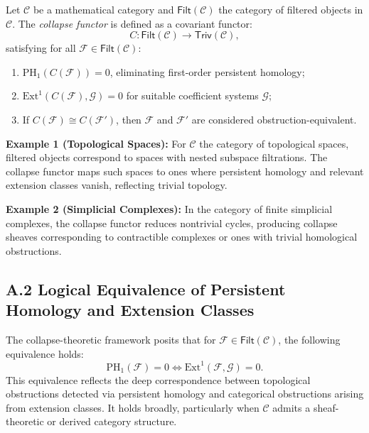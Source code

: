 \documentclass[11pt]{article}
\begin{document}
Let $\mathcal{C}$ be a mathematical category and $\mathsf{Filt}(\mathcal{C})$ the category of filtered objects in $\mathcal{C}$. The \emph{collapse functor} is defined as a covariant functor:
\begin{equation}
C : \mathsf{Filt}(\mathcal{C}) \longrightarrow \mathsf{Triv}(\mathcal{C}),
\end{equation}
satisfying for all $\mathcal{F} \in \mathsf{Filt}(\mathcal{C})$:

\begin{enumerate}
    \item $\mathrm{PH}_1(C(\mathcal{F})) = 0$, eliminating first-order persistent homology;
    \item $\mathrm{Ext}^1(C(\mathcal{F}), \mathcal{G}) = 0$ for suitable coefficient systems $\mathcal{G}$;
    \item If $C(\mathcal{F}) \cong C(\mathcal{F}')$, then $\mathcal{F}$ and $\mathcal{F}'$ are considered obstruction-equivalent.
\end{enumerate}

\textbf{Example 1 (Topological Spaces):} For $\mathcal{C}$ the category of topological spaces, filtered objects correspond to spaces with nested subspace filtrations. The collapse functor maps such spaces to ones where persistent homology and relevant extension classes vanish, reflecting trivial topology.

\textbf{Example 2 (Simplicial Complexes):} In the category of finite simplicial complexes, the collapse functor reduces nontrivial cycles, producing collapse sheaves corresponding to contractible complexes or ones with trivial homological obstructions.

\subsection*{A.2 Logical Equivalence of Persistent Homology and Extension Classes}

The collapse-theoretic framework posits that for $\mathcal{F} \in \mathsf{Filt}(\mathcal{C})$, the following equivalence holds:
\begin{equation}
\mathrm{PH}_1(\mathcal{F}) = 0 \iff \mathrm{Ext}^1(\mathcal{F}, \mathcal{G}) = 0.
\end{equation}
This equivalence reflects the deep correspondence between topological obstructions detected via persistent homology and categorical obstructions arising from extension classes. It holds broadly, particularly when $\mathcal{C}$ admits a sheaf-theoretic or derived category structure.
\end{document}

